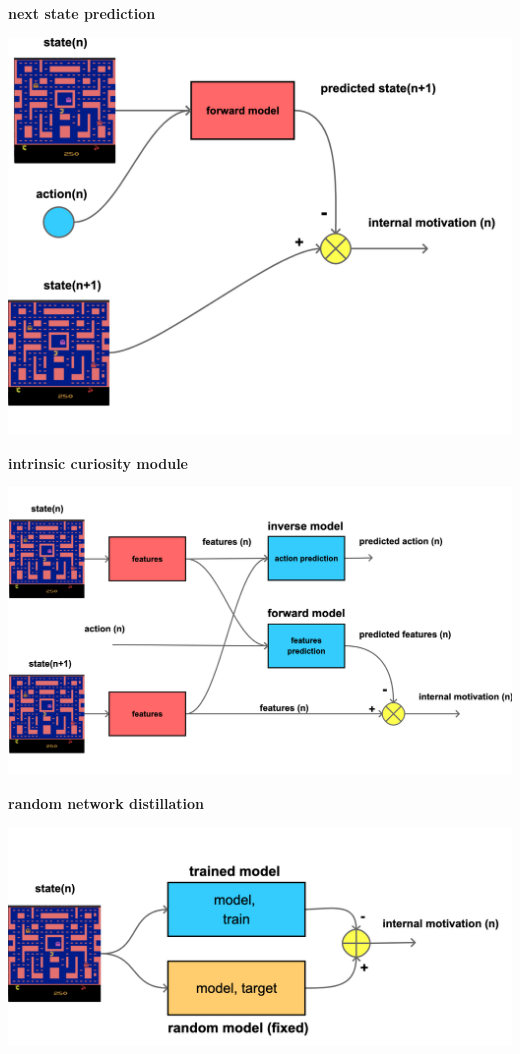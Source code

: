 \documentclass[xcolor=dvipsnames]{beamer}
\begin{document}
\begin{frame}{\bf next state prediction}

\centering
\includegraphics[scale=0.15]{../diagrams/internal_motivation/naive.png}

\end{frame}


\begin{frame}{\bf intrinsic curiosity module}

\centering
\includegraphics[scale=0.15]{../diagrams/internal_motivation/icm.png}

\end{frame}

\begin{frame}{\bf random network distillation}

\centering
\includegraphics[scale=0.15]{../diagrams/internal_motivation/rnd.png}

\end{frame}
\end{document}

